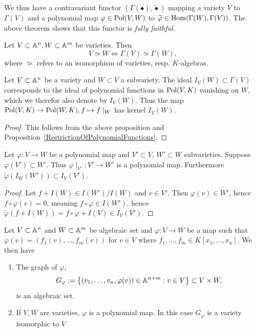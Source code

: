\begin{remark}
    We thus have a contravariant functor $(\Gamma(\bullet),\widetilde{\bullet})$ mapping a variety $V$ to $\Gamma(V)$ and a polynomial map $\varphi \in \mathrm{Pol}(V,W)$ to $\widetilde{\varphi}\in \mathrm{Hom}(\Gamma(W),\Gamma(V))$. The above theorem shows that this functor is \textit{fully faithful}.
\end{remark}
\begin{corollary}\label{FunctorialityOfInducedAlgebraHomomorphism}
    Let $V\subset \mathbb{A}^n, W\subset \mathbb{A}^m$ be varieties. Then 
    $$V \simeq W \iff \Gamma(V)\simeq \Gamma(W),$$
    where $\simeq$ refers to an isomorphism of varieties, resp. $K$-algebras.
\end{corollary}
\begin{proposition}
    Let $V\subset \mathbb{A}^n$ be a variety and $W\subset V$ a subvariety. The ideal $I_V(W)\subset \Gamma(V)$ corresponds to the ideal of polynomial functions in $\mathrm{Pol}(V,K)$ vanishing on $W$, which we therefor also denote by $I_V(W)$. Thus the map $\mathrm{Pol}(V,K)\rightarrow \mathrm{Pol}(W,K), f \mapsto f\mid_W$ has kernel $I_V(W)$.
\end{proposition}
\begin{proof}
    This follows from the above proposition and Proposition~\ref{RestrictionOfPolynomialFunctions}.
\end{proof}
\begin{proposition}
    Let $\varphi : V \rightarrow W$ be a polynomial map and $V'\subset V$, $W'\subset W$ subvarieties. Suppose $\varphi(V')\subset W'$. Thus  $\varphi\mid_{V'} : V'\rightarrow W'$ is a polynomial map. Furthermore $\widetilde{\varphi}(I_W(W')) \subset I_V(V')$.  
\end{proposition}
\begin{proof}
    Let $f+I(W)\in I(W')/I(W)$ and $v\in V'$. Then $\varphi(v)\in W'$, hence $f\circ \varphi(v) = 0$, meaning $f\circ \varphi \in I(W')$, hence $\widetilde{\varphi}(f+I(W))=f\circ \varphi + I(V) \in I_V(V').$
\end{proof}
\begin{lemma}
    Let $V\subset \mathbb{A}^n$ and $W\subset \mathbb{A}^m$ be algebraic set and $\varphi: V\rightarrow W$ be a map such that $\varphi(v) = (f_1(v),\dots,f_m(v))$ for $v\in V$ where $f_1,\dots,f_m\in K[x_1,\dots,x_n]$. We then have 
    \begin{enumerate}
        \item The graph of $\varphi$,
        $$G_\varphi := \left\{ (v_1,\dots,v_n, \varphi(v)) \in \mathbb{A}^{n+m} : v\in V \right\}\subset V\times W,$$
        is an algebraic set.
        \item If $V,W$ are varieties, $\varphi$ is a polynomial map. In this case $G_\varphi$ is a variety isomorphic to $V$
    \end{enumerate}
\end{lemma}
